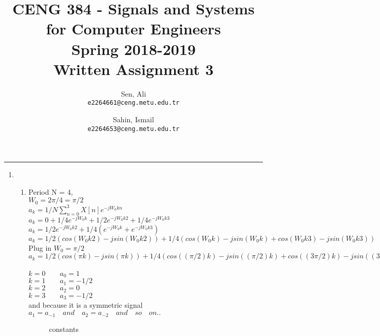 \documentclass[10pt,a4paper, margin=1in]{article}
\author{
  Sen, Ali\\
  \texttt{e2264661@ceng.metu.edu.tr}
  \and
  Sahin, Ismail\\
  \texttt{e2264653@ceng.metu.edu.tr}
}
\title{CENG 384 - Signals and Systems for Computer Engineers \\
Spring 2018-2019 \\
Written Assignment 3}
\begin{document}
\maketitle



\noindent\rule{19cm}{1.2pt}

\begin{enumerate}

\item 
    \begin{enumerate}
    \item %
    Period N = 4,\\ $W_0 = 2\pi/4 = \pi / 2$ \\
    $ a_k = 1/N \sum_{n=0}^{3} X[n]e^{-jW_0kn}$ \\
    $ a_k=0 + 1/4e^{-jW_0k}+ 1/2e^{-jW_0k2} + 1/4e^{-jW_0k3}$ \\
    $ a_k=1/2e^{-jW_0k2} + 1/4(e^{-jW_0k} + e^{-jW_0k3})$ \\
    $ a_k=1/2(cos(W_0k2)-jsin(W_0k2) ) + 1/4(cos(W_0k)-jsin(W_0k) + cos(W_0k3)-jsin(W_0k3))$ \\
    Plug in $W_0 = \pi / 2$\\
    $ a_k=1/2(cos(\pi k)-jsin(\pi k) ) + 1/4(cos((\pi/2)k)-jsin((\pi/2)k) + cos((3\pi/2)k)-jsin((3\pi/2)k))$ \\ \\
    $k=0   \qquad  a_0 = 1$ \\
    $k = 1 \qquad  a_1= -1/2$ \\
    $k = 2 \qquad  a_2= 0$ \\
    $k = 3 \qquad  a_3= -1/2$ \\
    and because it is a symmetric signal \\ 
    $a_1 = a_{-1} \quad and \quad a_2 = a_{-2} \quad and \quad so \quad on..$
    


\begin{figure} [h!]
    \centering
    \caption{ constants}
    \label{fig:q3}
\end{figure}
    

\end{enumerate}
\end{enumerate}
\end{document}
